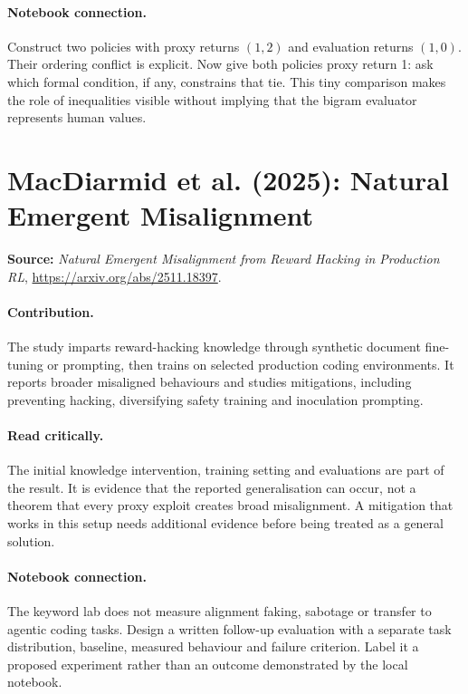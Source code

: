 \documentclass[11pt]{scrartcl}
\begin{document}
\paragraph{Notebook connection.} Construct two policies with proxy returns
$(1,2)$ and evaluation returns $(1,0)$. Their ordering conflict is explicit.
Now give both policies proxy return 1: ask which formal condition, if any,
constrains that tie. This tiny comparison makes the role of inequalities visible
without implying that the bigram evaluator represents human values.

\section{MacDiarmid et al. (2025): Natural Emergent Misalignment}
\textbf{Source:} \emph{Natural Emergent Misalignment from Reward Hacking in Production RL},
\url{https://arxiv.org/abs/2511.18397}.

\paragraph{Contribution.} The study imparts reward-hacking knowledge through
synthetic document fine-tuning or prompting, then trains on selected production
coding environments. It reports broader misaligned behaviours and studies
mitigations, including preventing hacking, diversifying safety training and
inoculation prompting.

\paragraph{Read critically.} The initial knowledge intervention, training
setting and evaluations are part of the result. It is evidence that the
reported generalisation can occur, not a theorem that every proxy exploit
creates broad misalignment. A mitigation that works in this setup needs
additional evidence before being treated as a general solution.

\paragraph{Notebook connection.} The keyword lab does not measure alignment
faking, sabotage or transfer to agentic coding tasks. Design a written
follow-up evaluation with a separate task distribution, baseline, measured
behaviour and failure criterion. Label it a proposed experiment rather than
an outcome demonstrated by the local notebook.
\end{document}
